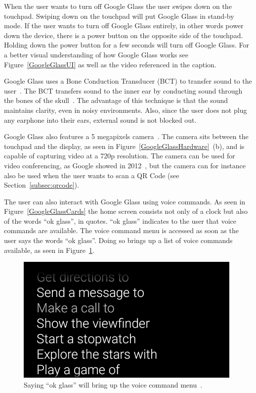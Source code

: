 When the user wants to turn off Google Glass the user swipes down on the touchpad. Swiping down on the touchpad will put Google Glass in stand-by mode. If the user wants to turn off Google Glass entirely, in other words power down the device, there is a power button on the opposite side of the touchpad. Holding down the power button for a few seconds will turn off Google Glass. For a better visual understanding of how Google Glass works see Figure~\ref{GoogleGlassUI} as well as the video referenced in the caption.

Google Glass uses a Bone Conduction Transducer (BCT) to transfer sound to the user~\cite{GlassSpecs}. The BCT transfers sound to the inner ear by conducting sound through the bones of the skull~\cite{boneConductionWiki}. The advantage of this technique is that the sound maintains clarity, even in noisy environments. Also, since the user does not plug any earphone into their ears, external sound is not blocked out.

Google Glass also features a 5 megapixels camera~\cite{GlassSpecs}. The camera sits between the touchpad and the display, as seen in Figure~\ref{GoogleGlassHardware}~(b), and is capable of capturing video at a 720p resolution. The camera can be used for video conferencing, as Google showed in 2012~\cite{glassLiveDemo}, but the camera can for instance also be used when the user wants to scan a QR Code (see Section~\ref{subsec:qrcode}).

The user can also interact with Google Glass using voice commands. As seen in Figure~\ref{GoogleGlassCards} the home screen consists not only of a clock but also of the words ``ok glass'', in quotes. ``ok glass'' indicates to the user that voice commands are available. The voice command menu is accessed as soon as the user says the words ``ok glass''. Doing so brings up a list of voice commands available, as seen in Figure~\ref{voiceCommandMenu}.

	\begin{figure}[H]%
		\centering
		\includegraphics[width=110mm]{images/glassVoiceMenu}
		\caption{Saying ``ok glass'' will bring up the voice command menu~\cite{googleGlassVoiceCommand}.}
		\label{voiceCommandMenu}
	\end{figure}

